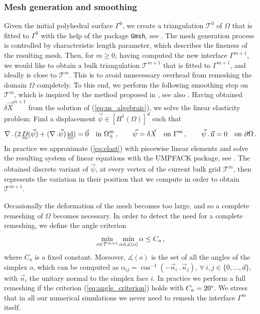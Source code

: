 \documentclass[a4paper,12pt,onecolumn]{article}
\newcommand{\sigmaO}{o}
\newcommand{\id}{\rm id}
\newcommand{\unitn}{\vec{\rm n}}
\newcommand{\mat}[1]{\underline{\underline{#1}}\rule{0pt}{0pt}}
\begin{document}
\subsubsection{Mesh generation and smoothing}\label{sec:smoothing}
Given the initial polyhedral surface $\Gamma^0$, we create a triangulation
$\mathcal{T}^0$ of $\Omega$ that is fitted to $\Gamma^0$ with the help of the
package \verb|Gmsh|, see \cite{GeuzaineR09}.
The mesh generation process is controlled by characteristic length
parameter, which describes the fineness of the resulting mesh.
Then, for $m \geq 0$, having computed the new interface $\Gamma^{m+1}$, we
would like to obtain a bulk triangulation $\mathcal{T}^{m+1}$ that is fitted to
$\Gamma^{m+1}$, and ideally is close to $\mathcal{T}^m$. This is to avoid
unnecessary overhead from remeshing the domain $\Omega$ completely.
To this end, we perform the following smoothing step on $\mathcal{T}^m$, which
is inspired by the method proposed in \cite{Ganesan06}, see also
\cite{GanesanT08}. Having obtained $\delta \vec X^{m+1}$ from the solution of
(\ref{eq:ns_algebraic}), we solve the linear elasticity problem: Find a
displacement $\vec\psi \in [H^1(\Omega)]^d$ such that
\begin{equation}
\nabla\,.\,(2\,\mat D(\vec\psi) + (\nabla\,.\vec\psi)\,\mat\id)
= \vec 0 \quad \mbox{in } \Omega_\pm^m\,,\qquad
\vec\psi = \delta \vec X \quad \mbox{on } \Gamma^m\,, \qquad
\vec\psi\,.\,\unitn = 0 \quad \mbox{on } \partial\Omega\,.
\label{eq:elast}
\end{equation}
In practice we approximate (\ref{eq:elast})
with piecewise linear elements and solve the resulting system of linear
equations with the UMPFACK package, see \cite{Davis04}. The obtained discrete
variant of $\vec\psi$, at every vertex of the current bulk grid
$\mathcal{T}^m$, then represents the variation in their position that we
compute in order to obtain $\mathcal{T}^{m+1}$.

Occasionally the deformation of the mesh becomes too large, and so a
complete remeshing of $\Omega$ becomes necessary. In order to detect the need
for a complete remeshing, we define the angle criterion
\begin{equation}\label{eq:angle_criterion}
\min_{\sigmaO\in {\cal T}^{m+1}}\min_{\alpha\in \measuredangle(\sigmaO)}\alpha
\leq C_a\,,
\end{equation}
where $C_a$ is a fixed constant. Moreover, $\measuredangle(\sigmaO)$ is the set
of all the angles of the simplex $\sigmaO$, which can be computed as
$\alpha_{ij}=\cos^{-1}(-\vec n_i\,.\,\vec n_j)$, $\forall\ i,j\in\{0,\dots,d\}$,
with $\vec n_i$ the unitary normal to the simplex face $i$.
In practice we perform a full remeshing if the
criterion (\ref{eq:angle_criterion}) holds with $C_a=20\degree$.
We stress that in all our numerical simulations we never need to remesh the
interface $\Gamma^m$ itself.
\end{document}
